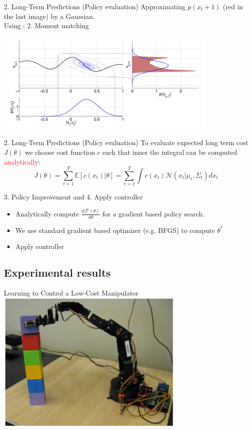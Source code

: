 \documentclass{beamer}
\begin{document}
\begin{frame}{2. Long-Term Predictions (Policy evaluation)}
Approximating $p(x_t+1)$ (red in the last image) by a Gaussian.\\
Using : 2. Moment matching
\begin{center}
    \includegraphics[height=5cm]{img/mom.png}
\end{center}
\end{frame}

\begin{frame}{2. Long-Term Predictions (Policy evaluation)}
To evaluate expected long term cost $J(\theta)$ we choose cost function $c$ such that inner the integral can be computed \textcolor{red}{analytically}:
$$J(\theta)=\sum_{t=1}^{T} \mathbb{E} [c(x_t)|\theta]=\sum_{t=1}^{T} \int c(x_t) \mathcal{N}(x_t|\mu_t,\Sigma_t) dx_t$$
\end{frame}

\begin{frame}{3. Policy Improvement and 4. Apply controller}
\begin{itemize}
    \item Analytically compute $\frac{d J^\pi (\theta)}{d\theta}$ for a gradient based policy search.
    \item We use standard gradient based optimizer (e.g. BFGS) to compute $\theta^*$
    \item Apply controller
\end{itemize}
\end{frame}

\subsection{Experimental results}
\begin{center}
Learning to Control a Low-Cost Manipulator\\
    \href{https://www.youtube.com/watch?v=gdT6dwUOYC0}{\includegraphics[height=7cm]{img/arm-p.png}}
\end{center}
\end{document}
